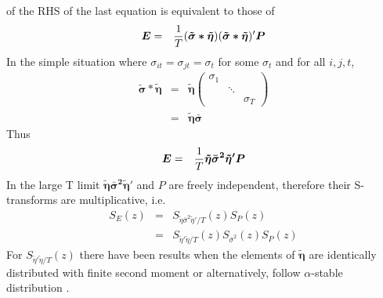 \documentclass{article}
\begin{document}
of the RHS of the last equation is equivalent to those of
\begin{eqnarray*}
  \bm E &=& {1 \over T} (\bm{\tilde{\sigma} * \tilde{\eta}}) (\bm{\tilde{\sigma}
    * \tilde{\eta}})' \bm P \\
\end{eqnarray*}
In the simple situation where $\sigma_{it} =
\sigma_{jt} = \sigma_t$ for some $\sigma_t$ and for all $i, j, t$,
\begin{eqnarray*}
  \bm{\tilde \sigma * \tilde \eta} &=& \bm{\tilde \eta}
  \begin{pmatrix}
    \sigma_1 &        & \\
        & \ddots & \\
        &        & \sigma_T
  \end{pmatrix} \\
  &=& \bm{\tilde \eta \bar \sigma}
\end{eqnarray*}
Thus
\begin{eqnarray}\label{eq:E_def}
  \bm E &=& {1 \over T}\bm{\tilde \eta \bar \sigma^2 \tilde \eta' P}
\end{eqnarray}
In the large T limit $\bm{\tilde \eta \bar \sigma^2 \tilde \eta'}$ and $P$ are
freely independent, therefore their S-transforms are multiplicative,
i.e.
\begin{eqnarray}
  S_E(z) &=& S_{\tilde \eta \bar \sigma^2 \tilde \eta'/T}(z) S_P(z)
  \nonumber \\
  &=& S_{\tilde \eta' \tilde \eta /T}(z) S_{\bar \sigma^2}(z) S_P(z) \label{eq:S_E}
\end{eqnarray}
For $S_{\tilde \eta' \tilde \eta /T}(z)$ there have been results when
the elements of $\bm{\tilde \eta}$ are identically distributed with finite
second moment \cite{burda2011} or alternatively, follow $\alpha$-stable
distribution \cite{politi2010}.
\end{document}
